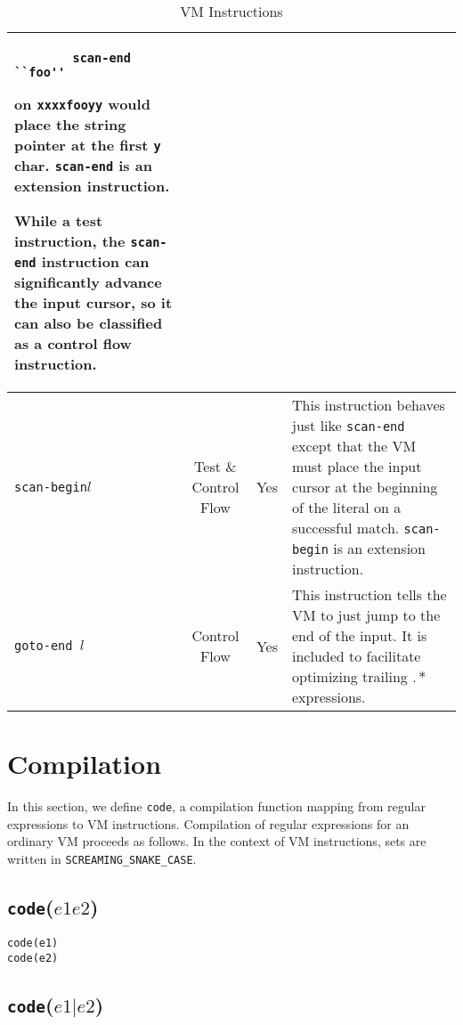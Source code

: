 \begin{table}[ht]
\begin{adjustwidth}{-2cm}{}
\begin{tabular}{ | l | c | c | p{10cm} | }
        \begin{verbatim}
        scan-end ``foo''
        \end{verbatim}

    on \verb'xxxxfooyy' would place the string pointer at the first \verb'y'
    char. \verb'scan-end' is an extension instruction.

    While a test instruction, the \verb'scan-end' instruction can
    significantly advance the input cursor, so it can also be classified
    as a control flow instruction. \\ \hline
{\tt scan-begin$l$} & Test \& Control Flow & Yes &
    This instruction behaves just like \verb'scan-end' except that the
    VM must place the input cursor at the beginning of the literal on
    a successful match. \verb'scan-begin' is an extension instruction.
    \\ \hline
{\tt goto-end $l$} & Control Flow & Yes &
    This instruction tells the VM to just jump to the end of the input.
    It is included to facilitate optimizing trailing $.*$ expressions.
    \\ \hline
\end{tabular}
\end{adjustwidth}

\caption{VM Instructions}
\label{tab:insts}
\end{table}

\section{Compilation}

In this section, we define \verb'code', a compilation function mapping
from regular expressions to VM instructions. Compilation of regular
expressions for an ordinary VM proceeds as follows. In the context
of VM instructions, sets are written in \verb'SCREAMING_SNAKE_CASE'.

\subsection{{\tt code}($e1 e2$)}

\begin{verbatim}
code(e1)
code(e2)
\end{verbatim}

\subsection{{\tt code}($e1 \rvert e2$)}

